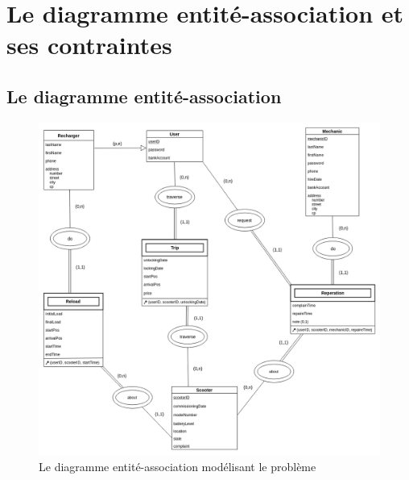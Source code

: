 \documentclass{article}
\begin{document}
\section{Le diagramme entité-association et ses contraintes }

    \subsection{Le diagramme entité-association}
        \begin{figure} [H]
            \centering
            \includegraphics[width=13cm]{images/v_2.png}
            \caption{Le diagramme entité-association modélisant le problème}
        \end{figure}
        
        
\end{document}
